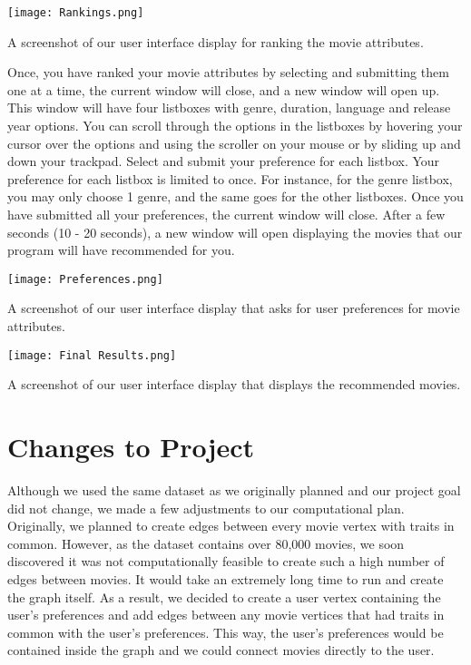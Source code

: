 \documentclass[fontsize=11pt]{article}
\begin{document}
\begin{center}
    \texttt{[image: Rankings.png]}

    A screenshot of our user interface display for ranking the movie attributes.
\end{center}

Once, you have ranked your movie attributes by selecting and submitting them one at a time, the current window will close, and a new window will open up. This window will have four listboxes with genre, duration, language and release year options. You can scroll through the options in the listboxes by hovering your cursor over the options and using the scroller on your mouse or by sliding up and down your trackpad. Select and submit your preference for each listbox. Your preference for each listbox is limited to once. For instance, for the genre listbox, you may only choose 1 genre, and the same goes for the other listboxes. Once you have submitted all your preferences, the current window will close. After a few seconds (10 - 20 seconds), a new window will open displaying the movies that our program will have recommended for you.\\

\begin{center}
    \texttt{[image: Preferences.png]}

    A screenshot of our user interface display that asks for user preferences for movie attributes.
\end{center}

\begin{center}
    \texttt{[image: Final Results.png]}

    A screenshot of our user interface display that displays the recommended movies.
\end{center}


\section*{Changes to Project}
Although we used the same dataset as we originally planned and our project goal did not change, we made a few adjustments to our computational plan. Originally, we planned to create edges between every movie vertex with traits in common. However, as the dataset contains over 80,000 movies, we soon discovered it was not computationally feasible to create such a high number of edges between movies. It would take an extremely long time to run and create the graph itself. As a result, we decided to create a user vertex containing the user's preferences and add edges between any movie vertices that had traits in common with the user's preferences. This way, the user's preferences would be contained inside the graph and we could connect movies directly to the user. \\
\end{document}
